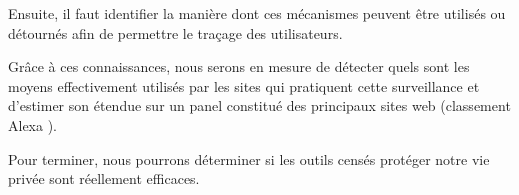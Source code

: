 Ensuite, il faut identifier la manière dont ces mécanismes peuvent être utilisés ou détournés afin de permettre le traçage des utilisateurs.

Grâce à ces connaissances, nous serons en mesure de détecter quels sont les moyens effectivement utilisés par les sites qui pratiquent cette surveillance et d'estimer son étendue sur un panel constitué des principaux sites web (classement Alexa \cite{AlexaTop}).

Pour terminer, nous pourrons déterminer si les outils censés protéger notre vie privée sont réellement efficaces. %
